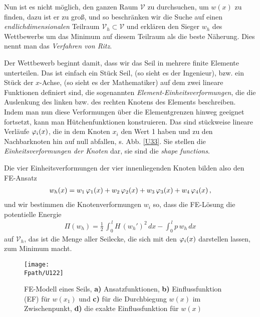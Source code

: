 Nun ist es nicht m\"{o}glich, den ganzen Raum $\mathcal{V}$ zu durchsuchen, um $w(x)$ zu finden, dazu ist er zu gro{\ss}, und so beschr\"{a}nken wir die Suche auf einen {\em endlichdimensionalen\/} Teilraum $\mathcal{V}_h \subset \mathcal{V}$ und erkl\"{a}ren den Sieger  $w_h$ des Wettbewerbs um das Minimum auf diesem Teilraum als die beste N\"{a}herung. Dies nennt man das {\em Verfahren von Ritz\/}.

Der Wettbewerb beginnt damit, dass wir das Seil in mehrere finite Elemente unterteilen. Das ist einfach ein St\"{u}ck Seil, (so sieht es der Ingenieur), bzw. ein St\"{u}ck der $x$-Achse, (so sieht es der Mathematiker) auf dem zwei lineare Funktionen definiert sind, die sogenannten {\em Element-Einheitsverformungen\/}, die die Auslenkung des linken bzw. des rechten Knotens des Elements beschreiben.  Indem man nun diese Verformungen \"{u}ber die Elementgrenzen hinweg geeignet fortsetzt, kann man \glq H\"{u}tchenfunktionen\grq{} konstruieren. Das sind st\"{u}ckweise lineare Verl\"{a}ufe $\varphi_i(x)$, die in dem Knoten $x_i$  den Wert 1 haben und zu den Nachbarknoten hin auf null abfallen, s. Abb. \ref{U33}. Sie stellen die {\em Einheitsverformungen der Knoten\/} dar, sie sind die {\em shape functions\/}.

Die vier Einheitsverformungen der vier innenliegenden Knoten bilden also den FE-Ansatz
\begin{align}\label{Eq112}
w_h(x) = w_1\,\varphi_1(x) + w_2\,\varphi_2(x) + w_3\,\varphi_3(x) + w_4\,\varphi_4(x)\,,
\end{align}
und wir bestimmen die Knotenverformungen $w_i$ so, dass die FE-L\"{o}sung die potentielle Energie
\begin{align}\label{Eq46}
\Pi(w_h)= \frac{1}{2}\,\int_0^{\,l} H\,(w_h')^2\,dx - \int_0^{\,l} p\,w_h\,dx
\end{align}
auf $\mathcal{V}_h$, das ist die Menge aller Seilecke, die sich mit den $\varphi_i(x)$ darstellen lassen, zum Minimum macht.
\begin{figure}[tbp]
\centering
\if {} \sidecaption[t] \fi
\texttt{[image: \\Fpath/U122]}
\caption{FE-Modell eines Seils, \textbf{a)} Ansatzfunktionen, \textbf{ b)} Einflussfunktion (EF) f\"{u}r $w(x_1)$ und \textbf{ c)} f\"{u}r die Durchbiegung $w(x)$ im Zwischenpunkt, \textbf{ d)} die exakte Einflussfunktion f\"{u}r $w(x)$} \label{U122}
\end{figure}%

